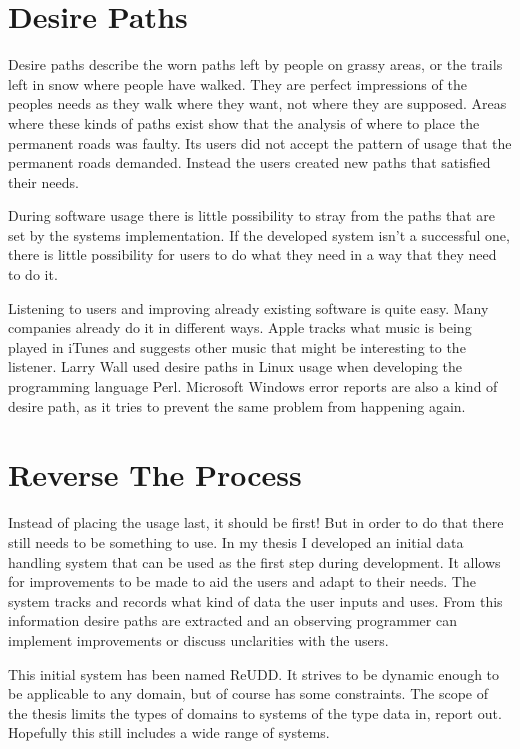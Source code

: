 \documentclass[a4paper]{article}
\begin{document}
\begin{multicols}{2}
\section*{Desire Paths}
Desire paths describe the worn paths left by people on grassy areas, or the trails left in snow where people have walked. They are perfect impressions of the peoples needs as they walk where they want, not where they are supposed. Areas where these kinds of paths exist show that the analysis of where to place the permanent roads was faulty. Its users did not accept the pattern of usage that the permanent roads demanded. Instead the users created new paths that satisfied their needs.

During software usage there is little possibility to stray from the paths that are set by the systems implementation. If the developed system isn't a successful one, there is little possibility for users to do what they need in a way that they need to do it.

Listening to users and improving already existing software is quite easy. Many companies already do it in different ways. Apple tracks what music is being played in iTunes and suggests other music that might be interesting to the listener. Larry Wall used desire paths in Linux usage when developing the programming language Perl. Microsoft Windows error reports are also a kind of desire path, as it tries to prevent the same problem from happening again.

\section*{Reverse The Process}
Instead of placing the usage last, it should be first! But in order to do that there still needs to be something to use. In my thesis I developed an initial data handling system that can be used as the first step during development. It allows for improvements to be made to aid the users and adapt to their needs. The system tracks and records what kind of data the user inputs and uses. From this information desire paths are extracted and an observing programmer can implement improvements or discuss unclarities with the users.

This initial system has been named ReUDD. It strives to be dynamic enough to be applicable to any domain, but of course has some constraints. The scope of the thesis limits the types of domains to systems of the type data in, report out. Hopefully this still includes a wide range of systems.


\end{multicols}
\end{document}

